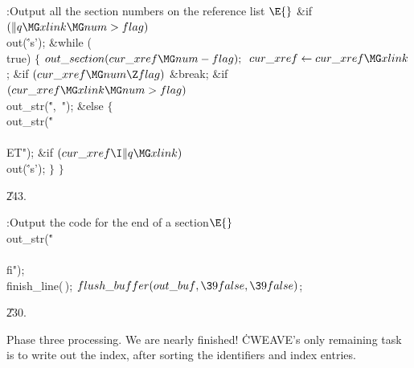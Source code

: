 \Y\B\4:Output all the section numbers on the reference list \X${}\E{}$\6
\&{if} ${}(\|q\MG\\{xlink}\MG\\{num}>\\{flag}){}$\1\5
\\{out}(\.{'s'});\2\6
\&{while} (\\{true})\5
${}\{{}$\1\6
${}\\{out\_section}(\\{cur\_xref}\MG\\{num}-\\{flag});{}$\6
${}\\{cur\_xref}\K\\{cur\_xref}\MG\\{xlink}{}$;\6
\&{if} ${}(\\{cur\_xref}\MG\\{num}\Z\\{flag}){}$\1\5
\&{break};\2\6
\&{if} ${}(\\{cur\_xref}\MG\\{xlink}\MG\\{num}>\\{flag}){}$\1\5
\\{out\_str}(\.{",\ "});\2\6
\&{else}\5
${}\{{}$\1\6
\\{out\_str}(\.{"\\\\ET"});\6
\&{if} ${}(\\{cur\_xref}\I\|q\MG\\{xlink}){}$\1\5
\\{out}(\.{'s'});\2\6
\4${}\}{}$\2\6
\4${}\}{}$\2\par
\U243.\fi

\B{}:Output the code for the end of a section\X${}\E{}$\6
\\{out\_str}(\.{"\\\\fi"});\6
\\{finish\_line}(\,);\6
${}\\{flush\_buffer}(\\{out\_buf},\39\\{false},\39\\{false}){}$;\par
\U230.\fi

Phase three processing.
We are nearly finished! \.{CWEAVE}'s only remaining task is to write out the
index, after sorting the identifiers and index entries.

